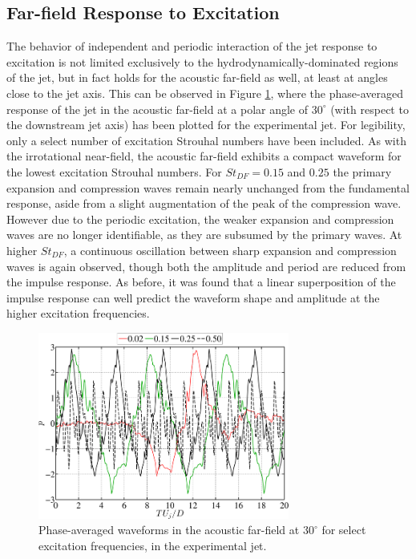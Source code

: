 \documentclass[english]{aiaa-tc}
\begin{document}
\subsection{Far-field Response to Excitation}
The behavior of independent and periodic interaction of the jet
response to excitation is not limited exclusively to the
hydrodynamically-dominated regions of the jet, but in fact holds for
the acoustic far-field as well, at least at angles close to the jet
axis. This can be observed in Figure \ref{PhavgFF1}, where the
phase-averaged response of the jet in the acoustic far-field at a
polar angle of $30^\circ$ (with respect to the downstream jet axis)
has been plotted for the experimental jet. For legibility, only a
select number of excitation Strouhal numbers have been included. As
with the irrotational near-field, the acoustic far-field exhibits a
compact waveform for the lowest excitation Strouhal numbers. For
$St_{DF}  = 0.15$ and $0.25$ the primary expansion and compression
waves remain nearly unchanged from the fundamental response, aside from
a slight augmentation of the peak of the compression wave. However due
to the periodic excitation, the weaker expansion and compression waves
are no longer identifiable, as they are subsumed by the primary
waves. At higher $St_{DF}$, a continuous oscillation between sharp
expansion and compression waves is again observed, though both the
amplitude and period are reduced from the impulse response. As before,
it was found that a linear superposition of the impulse response can
well predict the waveform shape and amplitude at the higher excitation
frequencies. 
\begin{figure}
\begin{center}
	\includegraphics[width=3.25in]{Phase_average_FF1}
    \caption{Phase-averaged waveforms in the acoustic far-field at $30^\circ$ for select excitation frequencies, in the experimental jet.}\label{PhavgFF1}
\end{center}
\end{figure}
\end{document}
